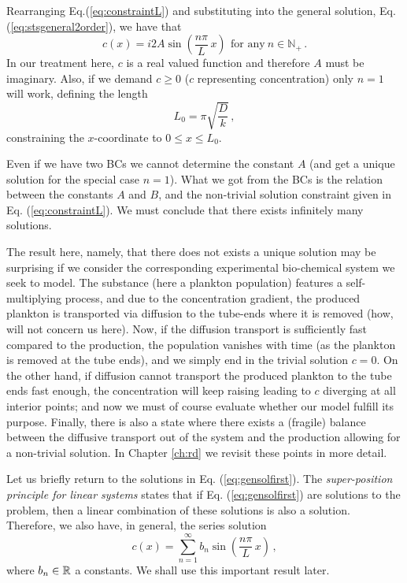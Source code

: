 Rearranging Eq.(\ref{eq:constraintL}) 
and substituting into the general solution, Eq. (\ref{eq:stsgeneral2order}), we have
that   
\begin{equation}
\label{eq:gensolfirst}
c(x) = i2A \sin\left(\frac{n \pi}{L} \, x \right) \, \ \text{for any} \ n \in \mathbb{N}_+ \, .
\end{equation}
In our treatment here, $c$ is a real valued function and therefore $A$ must be imaginary. Also, if 
we demand $c \geq 0$ ($c$ representing concentration) only $n=1$  will work, defining the length    
\begin{equation}
  \label{eq:L0}
  L_0 = \pi  \sqrt{\frac{D}{k}} \, ,
\end{equation}
constraining the $x$-coordinate to $0 \leq x \leq L_0$. 

Even if we have two BCs we cannot determine the constant $A$ (and get a unique solution for 
the special case $n=1$). What we got from the BCs is the relation between the constants $A$ and $B$, 
and the non-trivial solution constraint given in Eq. (\ref{eq:constraintL}). 
We must conclude that there exists infinitely many solutions. 

The result here, namely, that there does not exists a unique solution may be 
surprising if we consider the corresponding
experimental bio-chemical system we seek to model. The substance (here a plankton population)
features a self-multiplying process, and due to the concentration gradient,
the produced plankton is transported via diffusion to the tube-ends where it is
removed (how, will not concern us here). Now, if the diffusion transport 
is sufficiently fast compared to the production, the population vanishes with time 
(as the plankton is removed at the tube ends), and we simply end in the trivial solution $c=0$. 
On the other hand, if diffusion cannot transport the produced plankton to the tube ends fast enough, the concentration
will keep raising leading to $c$ diverging at all interior points; and now we must of course evaluate whether our
model fulfill its purpose. Finally, there is also a state where there exists a 
(fragile) balance between the diffusive transport out of the system 
and the production allowing for a non-trivial solution. \label{page:nouniquness} In Chapter \ref{ch:rd} we revisit these points in more detail. 

Let us briefly return to the solutions in Eq. (\ref{eq:gensolfirst}). The \emph{super-position principle for linear systems} 
states that if Eq. (\ref{eq:gensolfirst}) are solutions to the problem, then a
linear combination of these solutions is also a solution. Therefore, we also
have, in general, the series solution
\begin{equation}
	\label{eq:2ndorderseries}
	c(x) = \sum_{n=1}^\infty b_n \sin\left(\frac{n\pi}{L} \, x \right) \, ,
\end{equation}
where $b_n \in \mathbb{R}$ a constants. We shall use this important result later.


